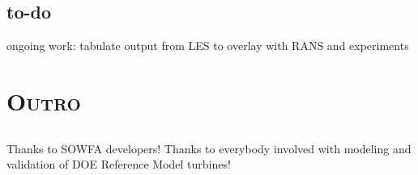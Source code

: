 \documentclass[xcolor=x11names,compress]{beamer}
\begin{document}
\subsection{to-do}
	
	\begin{frame}{}

		ongoing work: tabulate output from LES to overlay with RANS and experiments

	\end{frame}

\section{\scshape Outro}

\subsection{}
	\begin{frame}{}
		Thanks to SOWFA developers! Thanks to everybody involved with 
		modeling and validation of DOE Reference Model turbines!

		\printbibliography[heading=none]

	\end{frame}

\end{document}
